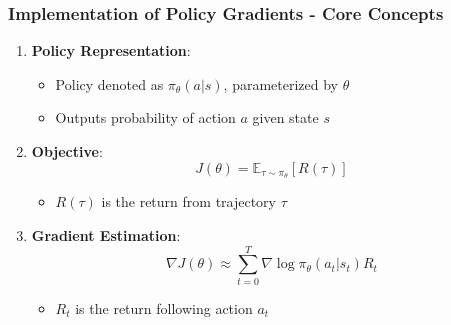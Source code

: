 \documentclass[aspectratio=169]{beamer}
\begin{document}
\begin{frame}[fragile]
    \frametitle{Implementation of Policy Gradients - Core Concepts}
    \begin{enumerate}
        \item \textbf{Policy Representation}:
            \begin{itemize}
                \item Policy denoted as $\pi_\theta(a|s)$, parameterized by $\theta$
                \item Outputs probability of action $a$ given state $s$
            \end{itemize}
        \item \textbf{Objective}:
            \begin{equation}
                J(\theta) = \mathbb{E}_{\tau \sim \pi_\theta} \left[ R(\tau) \right]
            \end{equation}
            \begin{itemize}
                \item $R(\tau)$ is the return from trajectory $\tau$
            \end{itemize}
        \item \textbf{Gradient Estimation}:
            \begin{equation}
                \nabla J(\theta) \approx \sum_{t=0}^{T} \nabla \log \pi_\theta(a_t | s_t) R_t
            \end{equation}
            \begin{itemize}
                \item $R_t$ is the return following action $a_t$
            \end{itemize}
    \end{enumerate}
\end{frame}
\end{document}
